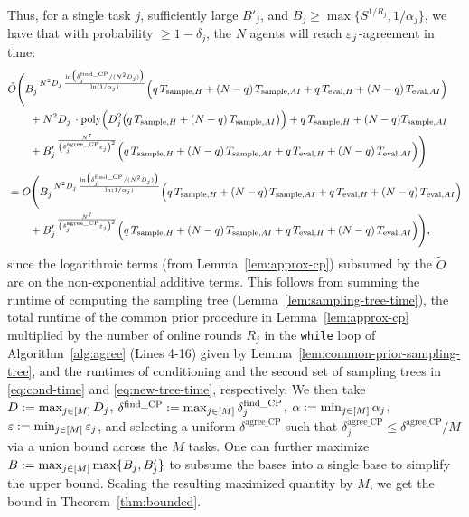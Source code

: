 Thus, for a single task $j$, sufficiently large $B'_j$, and $B_j \ge \max\{S^{1/R_j},1/\alpha_j\}$, we have that with probability $\ge 1 - \delta_j$, the $N$ agents will reach $\varepsilon_j$-agreement in time:
\begin{equation*}
\begin{split}
&\tilde{O}\Biggl({B_j}^{\,N^2 D_j\, \frac{\ln\bigl(\delta^{\text{find\_CP}}_j/(N^2 D_j)\bigr)}{\ln(1/\alpha_j)}} 
\Bigl( q\,T_{\text{sample},H} + (N-q)\,T_{\text{sample},AI} + q\,T_{\text{eval},H} + (N-q)\,T_{\text{eval},AI} \Bigr) \\
& \quad{}\quad{} + N^2 D_j\, \cdot\mathrm{poly}\Bigl( D_j^2\bigl(q\,T_{\text{sample},H}+(N-q)\,T_{\text{sample},AI}\bigr)\Bigr) + q\,T_{\text{sample},H}+(N-q)T_{\text{sample},AI} \\
& \quad{}\quad{} + {B'_j}^{\,\frac{N^7}{\left(\delta^{\text{agree\_CP}}_j\varepsilon_j\right)^2}}
\Bigl( q\,T_{\text{sample},H} + (N-q)\,T_{\text{sample},AI} + q\,T_{\text{eval},H} + (N-q)\,T_{\text{eval},AI} \Bigr)
\Biggr)\\
&= O\Biggl({B_j}^{\,N^2 D_j\, \frac{\ln\bigl(\delta^{\text{find\_CP}}_j/(N^2 D_j)\bigr)}{\ln(1/\alpha_j)}} 
\Bigl( q\,T_{\text{sample},H} + (N-q)\,T_{\text{sample},AI} + q\,T_{\text{eval},H} + (N-q)\,T_{\text{eval},AI} \Bigr) \\
& \quad{}\quad{} + {B'_j}^{\,\frac{N^7}{\left(\delta^{\text{agree\_CP}}_j\varepsilon_j\right)^2}}
\Bigl( q\,T_{\text{sample},H} + (N-q)\,T_{\text{sample},AI} + q\,T_{\text{eval},H} + (N-q)\,T_{\text{eval},AI} \Bigr)
\Biggr),
\end{split}
\end{equation*}
since the logarithmic terms (from Lemma~\ref{lem:approx-cp}) subsumed by the $\tilde{O}$ are on the non-exponential additive terms.
This follows from summing the runtime of computing the sampling tree (Lemma~\ref{lem:sampling-tree-time}), the total runtime of the common prior procedure in Lemma~\ref{lem:approx-cp} multiplied by the number of online rounds $R_j$ in the \texttt{while} loop of Algorithm~\ref{alg:agree} (Lines 4-16) given by Lemma~\ref{lem:common-prior-sampling-tree}, and the runtimes of conditioning and the second set of sampling trees in \eqref{eq:cond-time} and \eqref{eq:new-tree-time}, respectively.
We then take $D := \max_{j\in [M]} D_j$, $\delta^{\text{find\_CP}}:= \max_{j \in [M]} \delta^{\text{find\_CP}}_j$, $\alpha := \min_{j \in [M]} \alpha_j$, $\varepsilon:= \min_{j \in [M]} \varepsilon_j$, and selecting a uniform $\delta^{\text{agree\_CP}}$ such that $\delta^{\text{agree\_CP}}_j \le \delta^{\text{agree\_CP}}/M$ via a union bound across the $M$ tasks.
One can further maximize $B := \max_{j\in [M]}\max\{B_j, B'_j\}$ to subsume the bases into a single base to simplify the upper bound.
Scaling the resulting maximized quantity by $M$, we get the bound in Theorem~\ref{thm:bounded}.

